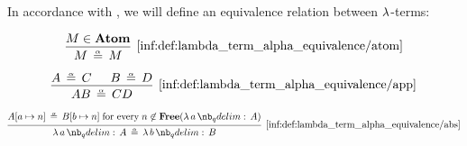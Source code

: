 \begin{definition}\label{def:lambda_term_alpha_equivalence}\mimprovised
  In accordance with , we will define an equivalence relation between \( \mathrm{\lambda} \)-terms:

  \begin{paracol}{2}
    \begin{leftcolumn}
      \begin{equation*}\taglabel[\ensuremath{ \logic{Atom}_\alpha }]{inf:def:lambda_term_alpha_equivalence/atom}
        \begin{prooftree}
          \hypo{ M \in \op*{Atom} }
          \infer1[\ref{inf:def:lambda_term_alpha_equivalence/atom}]{ M \aequiv M }
        \end{prooftree}
      \end{equation*}
    \end{leftcolumn}

    \begin{rightcolumn}
      \begin{equation*}\taglabel[\ensuremath{ \logic{App}_\alpha }]{inf:def:lambda_term_alpha_equivalence/app}
        \begin{prooftree}
          \hypo{ A \aequiv C }
          \hypo{ B \aequiv D }
          \infer2[\ref{inf:def:lambda_term_alpha_equivalence/app}]{ AB \aequiv CD }
        \end{prooftree}
      \end{equation*}
    \end{rightcolumn}
  \end{paracol}

  \begin{equation*}\taglabel[\ensuremath{ \logic{Abs}_\alpha }]{inf:def:lambda_term_alpha_equivalence/abs}
    \begin{prooftree}
      \hypo{ A[a \mapsto n] \aequiv B[b \mapsto n] \T{for every} n \not\in \op*{Free}(\qabs a A) }
      \infer1[\ref{inf:def:lambda_term_alpha_equivalence/abs}]{ \qabs a A \aequiv \qabs b B }
    \end{prooftree}
  \end{equation*}
\end{definition}
